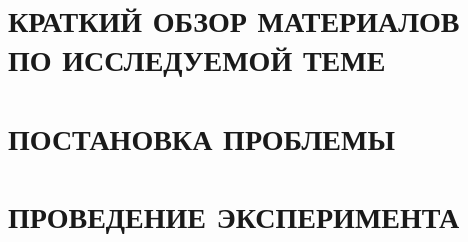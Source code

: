 \documentclass[a4paper, 14pt]{extreport}
\begin{document}
%


%
%
\setcounter{page}{4}

\tableofcontents
\newpage



\label{ch:intro}


\chapter[КРАТКИЙ ОБЗОР МАТЕРИАЛОВ]%
{КРАТКИЙ ОБЗОР МАТЕРИАЛОВ ПО ИССЛЕДУЕМОЙ ТЕМЕ}\label{ch:survey}






\chapter{ПОСТАНОВКА ПРОБЛЕМЫ}\label{ch:problem}




\chapter{ПРОВЕДЕНИЕ ЭКСПЕРИМЕНТА}\label{ch:realisation}






\newpage
{}


\newpage
{}
\printbibliography[heading=none]
\end{document}
